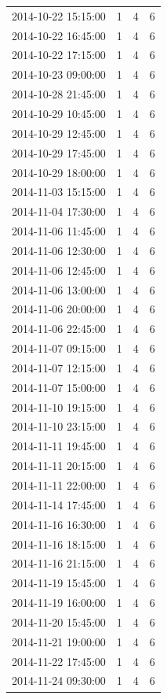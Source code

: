\begin{tabular}{lrrr}
2014-10-22 15:15:00 & 1 & 4 & 6 \\
2014-10-22 16:45:00 & 1 & 4 & 6 \\
2014-10-22 17:15:00 & 1 & 4 & 6 \\
2014-10-23 09:00:00 & 1 & 4 & 6 \\
2014-10-28 21:45:00 & 1 & 4 & 6 \\
2014-10-29 10:45:00 & 1 & 4 & 6 \\
2014-10-29 12:45:00 & 1 & 4 & 6 \\
2014-10-29 17:45:00 & 1 & 4 & 6 \\
2014-10-29 18:00:00 & 1 & 4 & 6 \\
2014-11-03 15:15:00 & 1 & 4 & 6 \\
2014-11-04 17:30:00 & 1 & 4 & 6 \\
2014-11-06 11:45:00 & 1 & 4 & 6 \\
2014-11-06 12:30:00 & 1 & 4 & 6 \\
2014-11-06 12:45:00 & 1 & 4 & 6 \\
2014-11-06 13:00:00 & 1 & 4 & 6 \\
2014-11-06 20:00:00 & 1 & 4 & 6 \\
2014-11-06 22:45:00 & 1 & 4 & 6 \\
2014-11-07 09:15:00 & 1 & 4 & 6 \\
2014-11-07 12:15:00 & 1 & 4 & 6 \\
2014-11-07 15:00:00 & 1 & 4 & 6 \\
2014-11-10 19:15:00 & 1 & 4 & 6 \\
2014-11-10 23:15:00 & 1 & 4 & 6 \\
2014-11-11 19:45:00 & 1 & 4 & 6 \\
2014-11-11 20:15:00 & 1 & 4 & 6 \\
2014-11-11 22:00:00 & 1 & 4 & 6 \\
2014-11-14 17:45:00 & 1 & 4 & 6 \\
2014-11-16 16:30:00 & 1 & 4 & 6 \\
2014-11-16 18:15:00 & 1 & 4 & 6 \\
2014-11-16 21:15:00 & 1 & 4 & 6 \\
2014-11-19 15:45:00 & 1 & 4 & 6 \\
2014-11-19 16:00:00 & 1 & 4 & 6 \\
2014-11-20 15:45:00 & 1 & 4 & 6 \\
2014-11-21 19:00:00 & 1 & 4 & 6 \\
2014-11-22 17:45:00 & 1 & 4 & 6 \\
2014-11-24 09:30:00 & 1 & 4 & 6 \\

\end{tabular}
